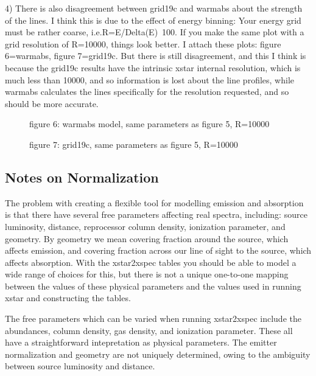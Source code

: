 4) There is also disagreement between grid19c and warmabs about the 
strength of the lines.  I think this is due to the effect of energy 
binning:  Your energy grid must be rather coarse, i.e.R=E/Delta(E)~100.
If you make the same plot with a grid resolution of R=10000, things look 
better.  I attach these plots: figure 6=warmabs, figure 7=grid19c.  But there is 
still disagreement, and this I think is because the grid19c results have 
the intrinsic xstar internal resolution, which is much less than 10000, 
and so information is lost about the line profiles, while warmabs 
calculates the lines specifically for the resolution requested, and so 
should be more accurate.

\setcounter{figure}{6}

\begin{figure}
\epsfxsize=5.6in  %
\epsfysize=7.0in  %
\caption{figure 6: warmabs model, same parameters as figure 5, R=10000}
\label{fig:6 }
\end{figure}

\begin{figure}
\epsfxsize=5.6in  %
\epsfysize=7.0in  %
\caption{figure 7: grid19c, same parameters as figure 5, R=10000}
\label{fig: 7 }
\end{figure}


\subsection{Notes on Normalization}


The problem with creating a flexible tool for modelling emission and 
absorption is that there have several free parameters affecting 
real spectra, including: source luminosity, distance, reprocessor column density, 
ionization parameter, and geometry.  By geometry we mean 
covering fraction around the source, which affects emission, and covering
fraction across our line of sight to the source, which affects absorption.
With the xstar2xspec tables you should be able to model a wide range
of choices for this, but there is not a unique one-to-one mapping between the 
values of these physical parameters and the values used in running xstar and 
constructing the tables.

The free parameters which can be varied when running xstar2xspec include the abundances, 
column density, gas density, and ionization parameter.  These all have a straightforward intepretation 
as physical parameters.  The emitter normalization and geometry are not 
uniquely determined, owing to the ambiguity between source luminosity and distance. 

